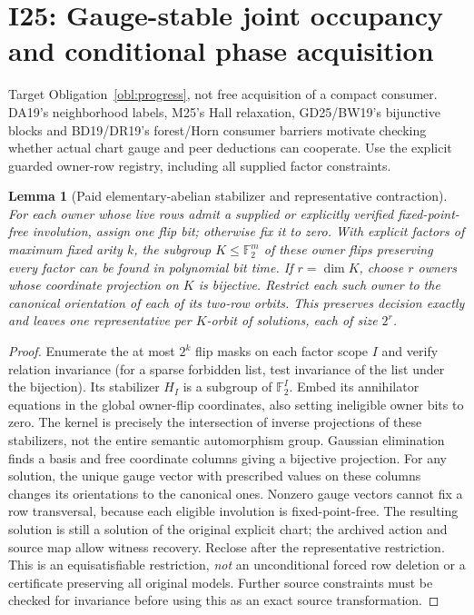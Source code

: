 \documentclass[11pt]{article}
\newtheorem{lemma}[theorem]{Lemma}
\begin{document}
\section{I25: Gauge-stable joint occupancy and conditional phase acquisition}\label{sec:i25}
Target Obligation~\ref{obl:progress}, not free acquisition of a compact consumer. DA19's neighborhood labels, M25's Hall relaxation, GD25/BW19's bijunctive blocks and BD19/DR19's forest/Horn consumer barriers motivate checking whether actual chart gauge and peer deductions can cooperate. Use the explicit guarded owner-row registry, including all supplied factor constraints.
\begin{lemma}[Paid elementary-abelian stabilizer and representative contraction]\label{lem:i25-gauge}
For each owner whose live rows admit a supplied or explicitly verified fixed-point-free involution, assign one flip bit; otherwise fix it to zero. With explicit factors of maximum fixed arity $k$, the subgroup $K\le\mathbb F_2^m$ of these owner flips preserving every factor can be found in polynomial bit time. If $r=\dim K$, choose $r$ owners whose coordinate projection on $K$ is bijective. Restrict each such owner to the canonical orientation of each of its two-row orbits. This preserves decision exactly and leaves one representative per $K$-orbit of solutions, each of size $2^r$.
\end{lemma}
\begin{proof}
Enumerate the at most $2^k$ flip masks on each factor scope $I$ and verify relation invariance (for a sparse forbidden list, test invariance of the list under the bijection). Its stabilizer $H_I$ is a subgroup of $\mathbb F_2^I$. Embed its annihilator equations in the global owner-flip coordinates, also setting ineligible owner bits to zero. The kernel is precisely the intersection of inverse projections of these stabilizers, not the entire semantic automorphism group. Gaussian elimination finds a basis and free coordinate columns giving a bijective projection. For any solution, the unique gauge vector with prescribed values on these columns changes its orientations to the canonical ones. Nonzero gauge vectors cannot fix a row transversal, because each eligible involution is fixed-point-free. The resulting solution is still a solution of the original explicit chart; the archived action and source map allow witness recovery. Reclose after the representative restriction. This is an equisatisfiable restriction, \emph{not} an unconditional forced row deletion or a certificate preserving all original models. Further source constraints must be checked for invariance before using this as an exact source transformation.
\end{proof}
\end{document}
